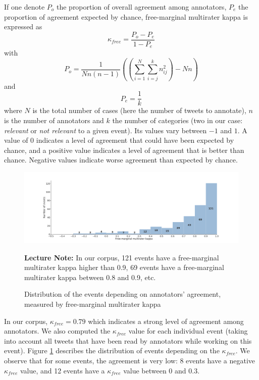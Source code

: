If one denote $P_o$ the proportion of overall agreement among annotators, $P_e$ the proportion of agreement expected by chance, free-marginal multirater kappa is expressed as 
$$
\kappa_{free} = \frac{P_o - P_e}{1 - P_e}
$$
with 
$$
P_o = \frac{1}{Nn(n-1)}((\sum_{i=1}^N\sum_{i=j}^kn_{ij}^2)-Nn)
$$
and
$$
P_e = \frac{1}{k}
$$
where $N$ is the total number of cases (here the number of tweets to annotate), $n$ is the number of annotators and $k$ the number of categories (two in our case: \textit{relevant} or \textit{not relevant} to a given event). Its values vary between $-1$ and $1$. A value of $0$ indicates a level of agreement that could have been expected by chance, and a positive value indicates a level of agreement that is better than chance. Negative values indicate worse agreement than expected by chance.


\begin{figure}
\begin{center}
\includegraphics[width=1\textwidth]{figures/HistogramEventsDistributionByKappa.pdf}
\end{center}
{\scriptsize \textbf{Lecture Note:} In our corpus, 121 events have a free-marginal multirater kappa higher than 0.9, 69 events have a free-marginal multirater kappa between 0.8 and 0.9, etc.
}
\caption{Distribution of the events depending on annotators' agreement, measured by free-marginal multirater kappa}
\label{Figure:HistogramEventsByKappa}
\end{figure}

In our corpus, $\kappa_{free} = 0.79$ which indicates a strong level of agreement among annotators. We also computed the $\kappa_{free}$ value for  each individual event (taking into account all tweets that have been read by annotators while working on this event). Figure \ref{Figure:HistogramEventsByKappa} describes the distribution of events depending on the $\kappa_{free}$. We observe that for some events, the agreement is very low: 8 events have a negative $\kappa_{free}$ value, and 12 events have a $\kappa_{free}$ value between 0 and 0.3.



